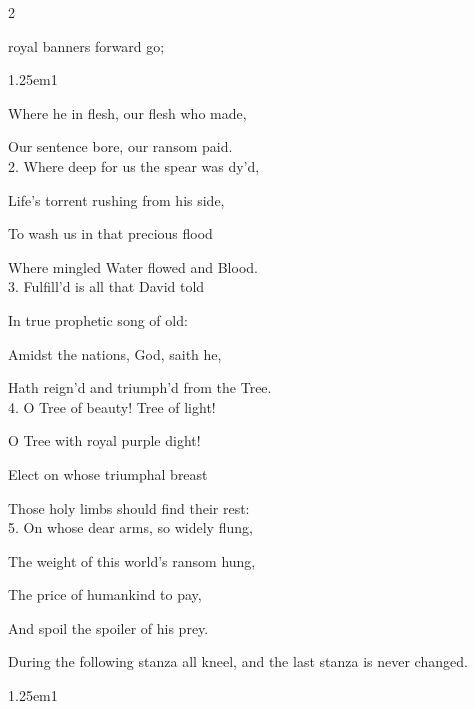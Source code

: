 
\begin{paracol}{2}
\sloppy

\firstEvensong
{}

\firstEvensongHymn
{} royal banners forward go;


\begin{hangparas}{1.25em}{1}

Where he in flesh, our flesh who made,

Our sentence bore, our ransom paid.\\

2. Where deep for us the spear was dy'd,

Life's torrent rushing from his side,

To wash us in that precious flood

Where mingled Water flowed and Blood.\\

3. Fulfill'd is all that David told

In true prophetic song of old:

Amidst the nations, God, saith he,

Hath reign'd and triumph'd from the Tree.\\

4. O Tree of beauty! Tree of light!

O Tree with royal purple dight!

Elect on whose triumphal breast

Those holy limbs should find their rest:\\

5. On whose dear arms, so widely flung,

The weight of this world’s ransom hung,

The price of humankind to pay,

And spoil the spoiler of his prey.
\end{hangparas}

\begin{rubric}
	During the following stanza all kneel, and the last stanza is never changed.
\end{rubric}

\begin{hangparas}{1.25em}{1}


\end{hangparas}
\end{paracol}
